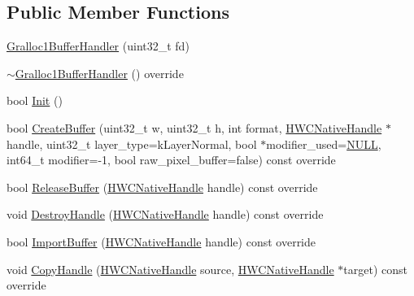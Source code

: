 \subsection*{Public Member Functions}
\begin{DoxyCompactItemize}
\item 
\mbox{\hyperlink{classhwcomposer_1_1Gralloc1BufferHandler_a07552c435b9ccdd99c898a81d805cdd2}{Gralloc1\+Buffer\+Handler}} (uint32\+\_\+t fd)
\item 
\mbox{\hyperlink{classhwcomposer_1_1Gralloc1BufferHandler_a4802221a9b764fcb8c319a162d004be7}{$\sim$\+Gralloc1\+Buffer\+Handler}} () override
\item 
bool \mbox{\hyperlink{classhwcomposer_1_1Gralloc1BufferHandler_a1d70874f4b535fe0763be57f3d9b2efd}{Init}} ()
\item 
bool \mbox{\hyperlink{classhwcomposer_1_1Gralloc1BufferHandler_a980ee5c0aa77d99861a89bdf6294d2db}{Create\+Buffer}} (uint32\+\_\+t w, uint32\+\_\+t h, int format, \mbox{\hyperlink{alios_2platformdefines_8h_ac0a2eaf260f556d17fe489911f017bdf}{H\+W\+C\+Native\+Handle}} $\ast$handle, uint32\+\_\+t layer\+\_\+type=k\+Layer\+Normal, bool $\ast$modifier\+\_\+used=\mbox{\hyperlink{alios_2platformdefines_8h_a070d2ce7b6bb7e5c05602aa8c308d0c4}{N\+U\+LL}}, int64\+\_\+t modifier=-\/1, bool raw\+\_\+pixel\+\_\+buffer=false) const override
\item 
bool \mbox{\hyperlink{classhwcomposer_1_1Gralloc1BufferHandler_a21b27b52da92605736b164e8088b93fe}{Release\+Buffer}} (\mbox{\hyperlink{alios_2platformdefines_8h_ac0a2eaf260f556d17fe489911f017bdf}{H\+W\+C\+Native\+Handle}} handle) const override
\item 
void \mbox{\hyperlink{classhwcomposer_1_1Gralloc1BufferHandler_aac10a3d48f5dab43e3057ef9783bd6ea}{Destroy\+Handle}} (\mbox{\hyperlink{alios_2platformdefines_8h_ac0a2eaf260f556d17fe489911f017bdf}{H\+W\+C\+Native\+Handle}} handle) const override
\item 
bool \mbox{\hyperlink{classhwcomposer_1_1Gralloc1BufferHandler_a0341cd413ba6e7d422edf30a161cd2b9}{Import\+Buffer}} (\mbox{\hyperlink{alios_2platformdefines_8h_ac0a2eaf260f556d17fe489911f017bdf}{H\+W\+C\+Native\+Handle}} handle) const override
\item 
void \mbox{\hyperlink{classhwcomposer_1_1Gralloc1BufferHandler_a87adf9132b6567a3b167741beebcd9d3}{Copy\+Handle}} (\mbox{\hyperlink{alios_2platformdefines_8h_ac0a2eaf260f556d17fe489911f017bdf}{H\+W\+C\+Native\+Handle}} source, \mbox{\hyperlink{alios_2platformdefines_8h_ac0a2eaf260f556d17fe489911f017bdf}{H\+W\+C\+Native\+Handle}} $\ast$target) const override

\end{DoxyCompactItemize}
